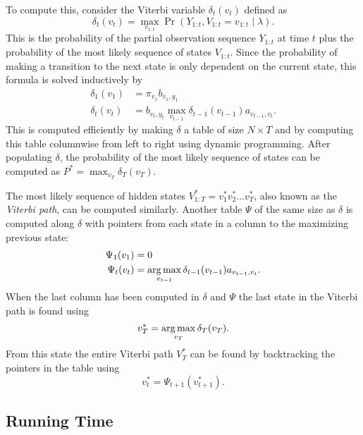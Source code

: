 To compute this, consider the Viterbi variable $\delta_t(v_t)$ defined as
\begin{equation*}
  \delta_t(v_t) = \max_{v_{1:t}} \Pr(Y_{1:t}, V_{1:t} = v_{1:t} \mid \lambda).
\end{equation*}
This is the probability of the partial observation sequence $Y_{1:t}$ at time
$t$ plus the probability of the most likely sequence of states $V_{1:t}$. Since
the probability of making a transition to the next state is only dependent on
the current state, this formula is solved inductively by
\begin{equation}
  \label{eq:1}
  \begin{aligned}
    \delta_1(v_1) &= \pi_{v_1} b_{v_1, y_1} \\
    \delta_t(v_t) &= b_{v_t, y_t} \max_{v_{t - 1}} \delta_{t - 1}(v_{t - 1}) a_{v_{t - 1}, v_t}.
  \end{aligned}
\end{equation}
This is computed efficiently by making $\delta$ a table of size
$N \times T$ and by computing this table columnwise from left to right
using dynamic programming. After populating $\delta$,
the probability of the most likely sequence of states can be computed as
$P^* = \max_{v_T} \delta_T(v_T)$.

The most likely sequence of hidden states $V_{1:T}^* = v_1^*v_2^*\dots{}v_T^*$,
also known as the \emph{Viterbi path}, can be computed similarly. Another table
$\Psi$ of the same size as $\delta$ is computed along $\delta$ with pointers
from each state in a column to the maximizing previous state:
\begin{equation*}
  \begin{aligned}
    \Psi_1(v_1) &= 0 \\
    \Psi_t(v_t) &= \operatorname*{arg\,max}_{v_{t - 1}} \delta_{t - 1}(v_{t - 1}) a_{v_{t - 1}, v_t}.
  \end{aligned}
\end{equation*}
When the last column has been computed in $\delta$ and $\Psi$ the last state
in the Viterbi path is found using
\begin{equation*}
  v_T^* = \operatorname*{arg\,max}_{v_T} \delta_T(v_T).
\end{equation*}
From this state the entire Viterbi path $V_T^*$ can be found by backtracking
the pointers in the table using
\begin{equation*}
  v_t^* = \Psi_{t + 1}(v_{t + 1}^*).
\end{equation*}

\subsection{Running Time}

